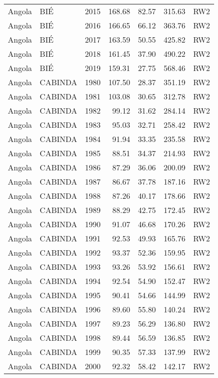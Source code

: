 \begin{longtable}{lllrrrl}
  Angola & BIÉ & 2015 & 168.68 & 82.57 & 315.63 & RW2 \\ 
  Angola & BIÉ & 2016 & 166.65 & 66.12 & 363.76 & RW2 \\ 
  Angola & BIÉ & 2017 & 163.59 & 50.55 & 425.82 & RW2 \\ 
  Angola & BIÉ & 2018 & 161.45 & 37.90 & 490.22 & RW2 \\ 
  Angola & BIÉ & 2019 & 159.31 & 27.75 & 568.46 & RW2 \\ 
  Angola & CABINDA & 1980 & 107.50 & 28.37 & 351.19 & RW2 \\ 
  Angola & CABINDA & 1981 & 103.08 & 30.65 & 312.78 & RW2 \\ 
  Angola & CABINDA & 1982 & 99.12 & 31.62 & 284.14 & RW2 \\ 
  Angola & CABINDA & 1983 & 95.03 & 32.71 & 258.42 & RW2 \\ 
  Angola & CABINDA & 1984 & 91.94 & 33.35 & 235.58 & RW2 \\ 
  Angola & CABINDA & 1985 & 88.51 & 34.37 & 214.93 & RW2 \\ 
  Angola & CABINDA & 1986 & 87.29 & 36.06 & 200.09 & RW2 \\ 
  Angola & CABINDA & 1987 & 86.67 & 37.78 & 187.16 & RW2 \\ 
  Angola & CABINDA & 1988 & 87.26 & 40.17 & 178.66 & RW2 \\ 
  Angola & CABINDA & 1989 & 88.29 & 42.75 & 172.45 & RW2 \\ 
  Angola & CABINDA & 1990 & 91.07 & 46.68 & 170.26 & RW2 \\ 
  Angola & CABINDA & 1991 & 92.53 & 49.93 & 165.76 & RW2 \\ 
  Angola & CABINDA & 1992 & 93.37 & 52.36 & 159.95 & RW2 \\ 
  Angola & CABINDA & 1993 & 93.26 & 53.92 & 156.61 & RW2 \\ 
  Angola & CABINDA & 1994 & 92.54 & 54.90 & 152.47 & RW2 \\ 
  Angola & CABINDA & 1995 & 90.41 & 54.66 & 144.99 & RW2 \\ 
  Angola & CABINDA & 1996 & 89.60 & 55.80 & 140.24 & RW2 \\ 
  Angola & CABINDA & 1997 & 89.23 & 56.29 & 136.80 & RW2 \\ 
  Angola & CABINDA & 1998 & 89.44 & 56.59 & 136.85 & RW2 \\ 
  Angola & CABINDA & 1999 & 90.35 & 57.33 & 137.99 & RW2 \\ 
  Angola & CABINDA & 2000 & 92.32 & 58.42 & 142.17 & RW2 \\ 

\end{longtable}

